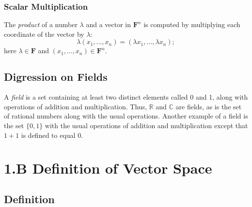 \documentclass[11pt]{article}
\begin{document}
    \subsubsection{Scalar Multiplication}
    The \emph{product} of a number \(\lambda\) and a vector in \(\textbf{F}^n\) is computed by multiplying each coordinate of the vector by \(\lambda\): \[\lambda (x_1, \dots, x_n) = (\lambda x_1, \dots, \lambda x_n);\] here \(\lambda \in \textbf{F}\) and \((x_1, \dots, x_n) \in \textbf{F}^n.\)

    \subsection{Digression on Fields}
    A \emph{field} is a set containing at least two distinct elements called 0 and 1, along with operations of addition and multiplication. Thus, \(\mathbb{R}\) and \(\mathbb{C}\) are fields, as is the set of rational numbers along with the usual operations. Another example of a field is the set \(\{0,1\}\) with the usual operations of addition and multiplication except that \(1+1\) is defined to equal 0.

    \pagebreak

    \section{1.B Definition of Vector Space}

    \subsection{Definition}
\end{document}
